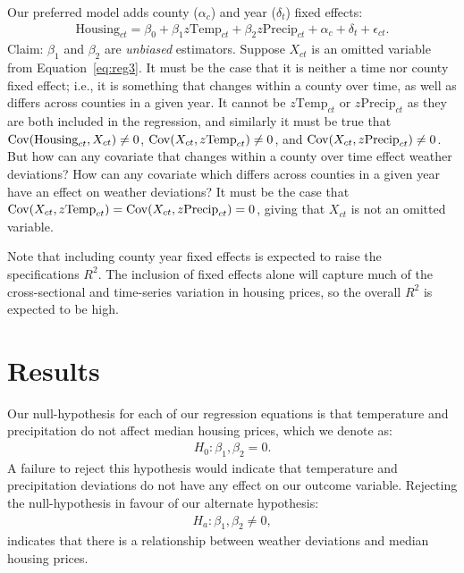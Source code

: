 \documentclass[12pt,reqno]{amsart}
\theoremstyle{definition}
\begin{document}
    Our preferred model adds county ($\alpha_c$) and year ($\delta_t$) fixed effects:
        \begin{equation}\label{eq:reg3}
        \begin{split}
            \text{Housing}_{ct} = \beta_0 + \beta_1z\text{Temp}_{ct} + \beta_2 z\text{Precip}_{ct} + \alpha_c + \delta_t + \epsilon_{ct}.
        \end{split}
        \end{equation}
    Claim: $\beta_1$ and $\beta_2$ are \textit{unbiased} estimators. Suppose $X_{ct}$ is an omitted variable from Equation~\ref{eq:reg3}. It must be the case that it is neither a time nor county fixed effect; i.e., it is something that changes within a county over time, as well as differs across counties in a given year. It cannot be $z\text{Temp}_{ct}$ or $z\text{Precip}_{ct}$ as they are both included in the regression, and similarly it must be true that $\operatorname{Cov}(\text{Housing}_{ct},X_{ct}) \neq 0$, $\operatorname{Cov}(X_{ct},z\text{Temp}_{ct}) \neq 0$, and $\operatorname{Cov}(X_{ct},z\text{Precip}_{ct}) \neq 0$. But how can any covariate that changes within a county over time effect weather deviations? How can any covariate which differs across counties in a given year have an effect on weather deviations? It must be the case that $\operatorname{Cov}(X_{ct},z\text{Temp}_{ct}) = \operatorname{Cov}(X_{ct},z\text{Precip}_{ct}) = 0$, giving that $X_{ct}$ is not an omitted variable. 

    Note that including county year fixed effects is expected to raise the specifications $R^2$. The inclusion of fixed effects alone will capture much of the cross-sectional and time-series variation in housing prices, so the overall $R^2$ is expected to be high.
\section{Results}\label{sec:results}

    

    Our null-hypothesis for each of our regression equations is that temperature and precipitation do not affect median housing prices, which we denote as:
        \begin{equation*}
        \begin{split}
            H_0: \beta_1,\beta_2 = 0.
        \end{split}
        \end{equation*}
    A failure to reject this hypothesis would indicate that temperature and precipitation deviations do not have any effect on our outcome variable. Rejecting the null-hypothesis in favour of our alternate hypothesis:
        \begin{equation*}
        \begin{split}
            H_a:\beta_1,\beta_2 \neq 0,
        \end{split}
        \end{equation*}
    indicates that there is a relationship between weather deviations and median housing prices. 
\end{document}

